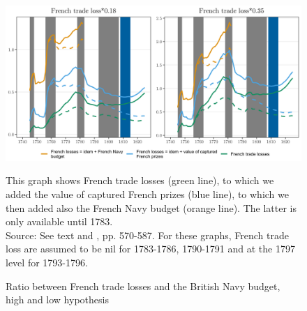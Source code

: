 \documentclass[12pt,a4paper,notitlepage,english]{article}
\newcommand{\fontsmall}{\fontsize{10pt}{12pt}\selectfont}
\begin{document}
\begin{appendix}
\begin{figure}[h!]
\caption{Ratio between French trade losses and the British Navy budget, high and low hypothesis}
\label{Ratio_BR_Expenditures}
\centering
\includegraphics[scale=0.2]{ratio_BR_expenditures_annual_loss}
\begin{minipage}{18cm}
\begin{flushleft}
\fontsmall 
This graph shows French trade losses (green line), to which we added the value of captured French prizes (blue line), to which we then added also the French Navy budget (orange line). The latter is only available until 1783. \\
Source: See text and \cite{mitchell1988}, pp. 570-587. For these graphs, French trade loss are assumed to be nil for 1783-1786, 1790-1791 and at the 1797 level for 1793-1796.
\end{flushleft}
\end{minipage}
\end{figure}


\end{appendix}
\end{document}
